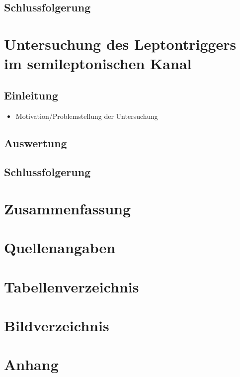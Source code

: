 \documentclass[12pt,a4paper]{article}
\begin{document}
\subsection{Schlussfolgerung}
\section{Untersuchung des Leptontriggers im semileptonischen Kanal}
\subsection{Einleitung}
\begin{itemize}
\item Motivation/Problemstellung der Untersuchung
\end{itemize}
\subsection{Auswertung}
\subsection{Schlussfolgerung}
\section{Zusammenfassung}
\section{Quellenangaben}
\section{Tabellenverzeichnis}
\section{Bildverzeichnis}
\section{Anhang}
\end{document}
